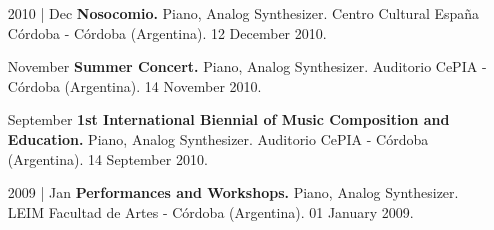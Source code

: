 \documentclass[12pt]{article}%
\begin{document}
\begin{itemize}[align=parleft,leftmargin=2.25cm,labelwidth=2cm]
\item[2010 | Dec]
\textbf{Nosocomio.}
Piano, Analog Synthesizer. 
Centro Cultural España Córdoba {-} Córdoba (Argentina). 
12 December 2010.
\end{itemize}%
\begin{itemize}[align=parleft,leftmargin=2.25cm,labelwidth=2cm]
\item[November]
\textbf{Summer Concert.}
Piano, Analog Synthesizer. 
Auditorio CePIA {-} Córdoba (Argentina). 
14 November 2010.
\end{itemize}%
\begin{itemize}[align=parleft,leftmargin=2.25cm,labelwidth=2cm]
\item[September]
\textbf{1st International Biennial of Music Composition and Education.}
Piano, Analog Synthesizer. 
Auditorio CePIA {-} Córdoba (Argentina). 
14 September 2010.
\end{itemize}%
\begin{itemize}[align=parleft,leftmargin=2.25cm,labelwidth=2cm]
\item[2009 | Jan]
\textbf{Performances and Workshops.}
Piano, Analog Synthesizer. 
LEIM Facultad de Artes {-} Córdoba (Argentina). 
01 January 2009.
\end{itemize}%
\end{document}
